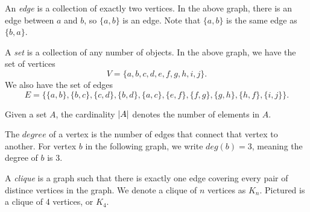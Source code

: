 \documentclass[11pt]{article}
\begin{document}
\begin{definition}
\label{def:edge}
An \textit{edge} is a collection of exactly two vertices. In the above graph, there is an edge
between $a$ and $b$, so $\{a, b\}$ is an edge. Note that $\{a,b\}$ is the same edge as $\{b,a\}$.
\end{definition}

\begin{definition}
\label{def:set}
A \textit{set} is a collection of any number of objects. In the above graph, we have the set of vertices
\[V=\{a, b, c, d, e, f, g, h, i, j\}.\]
We also have the set of edges
\[E=\{\{a,b\}, \{b,c\}, \{c,d\},\{b,d\},\{a,c\},\{e,f\},\{f,g\},\{g,h\},\{h,f\},\{i,j\} \}.\]
\end{definition}

\begin{definition}
\label{def:cardinality}
Given a set $A$, the cardinality $\left\lvert A \right\rvert$ denotes the number of elements in $A$.
\end{definition}

\begin{definition}
\label{def:degree}
The $degree$ of a vertex is the number of edges that connect that vertex to another. For vertex $b$ in the following graph, we write $deg(b) = 3$,
meaning the degree of $b$ is 3.
\begin{center}
\end{center}
\end{definition}

\begin{definition}
\label{def:clique}
A \textit{clique} is a graph such that there is exactly one edge covering every pair of distince vertices in the graph.
We denote a clique of $n$ vertices as $K_n$.
Pictured is a clique of 4 vertices, or $K_4$.
\begin{center}
\end{center}
\end{definition}
\end{document}
